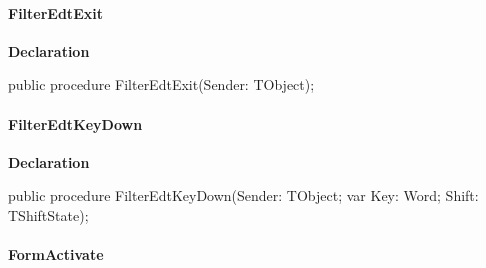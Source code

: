 \documentclass{report}
\newif\ifpdf
\begin{document}
\paragraph*{FilterEdtExit}\hspace*{\fill}

\label{manager.TMnFrm-FilterEdtExit}
\begin{list}{}{
\setlength{\itemindent}{0cm}
\setlength{\listparindent}{0cm}
\setlength{\leftmargin}{\evensidemargin}
\addtolength{\leftmargin}{\tmplength}
\settowidth{\labelsep}{X}
\addtolength{\leftmargin}{\labelsep}
\setlength{\labelwidth}{\tmplength}
}
\item[\textbf{Declaration}\hfill]
\ifpdf
\begin{flushleft}
\fi
\begin{ttfamily}
public procedure FilterEdtExit(Sender: TObject);\end{ttfamily}

\ifpdf
\end{flushleft}
\fi

\end{list}
\paragraph*{FilterEdtKeyDown}\hspace*{\fill}

\label{manager.TMnFrm-FilterEdtKeyDown}
\begin{list}{}{
\setlength{\itemindent}{0cm}
\setlength{\listparindent}{0cm}
\setlength{\leftmargin}{\evensidemargin}
\addtolength{\leftmargin}{\tmplength}
\settowidth{\labelsep}{X}
\addtolength{\leftmargin}{\labelsep}
\setlength{\labelwidth}{\tmplength}
}
\item[\textbf{Declaration}\hfill]
\ifpdf
\begin{flushleft}
\fi
\begin{ttfamily}
public procedure FilterEdtKeyDown(Sender: TObject; var Key: Word; Shift: TShiftState);\end{ttfamily}

\ifpdf
\end{flushleft}
\fi

\end{list}
\paragraph*{FormActivate}\hspace*{\fill}
\end{document}
